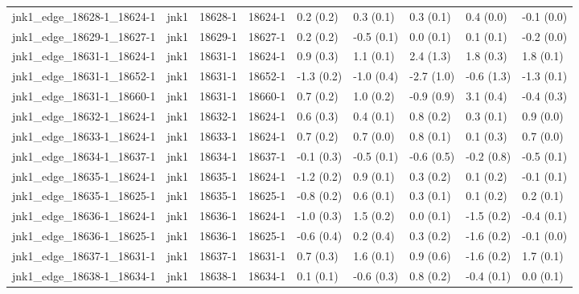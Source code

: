 \begin{tabular}{lllllllll}
jnk1\_edge\_18628-1\_18624-1        &      jnk1 &     18628-1 &     18624-1 &   0.2 (0.2) &         0.3 (0.1) &   0.3 (0.1) &   0.4 (0.0) &  -0.1 (0.0) \\
jnk1\_edge\_18629-1\_18627-1        &      jnk1 &     18629-1 &     18627-1 &   0.2 (0.2) &        -0.5 (0.1) &   0.0 (0.1) &   0.1 (0.1) &  -0.2 (0.0) \\
jnk1\_edge\_18631-1\_18624-1        &      jnk1 &     18631-1 &     18624-1 &   0.9 (0.3) &         1.1 (0.1) &   2.4 (1.3) &   1.8 (0.3) &   1.8 (0.1) \\
jnk1\_edge\_18631-1\_18652-1        &      jnk1 &     18631-1 &     18652-1 &  -1.3 (0.2) &        -1.0 (0.4) &  -2.7 (1.0) &  -0.6 (1.3) &  -1.3 (0.1) \\
jnk1\_edge\_18631-1\_18660-1        &      jnk1 &     18631-1 &     18660-1 &   0.7 (0.2) &         1.0 (0.2) &  -0.9 (0.9) &   3.1 (0.4) &  -0.4 (0.3) \\
jnk1\_edge\_18632-1\_18624-1        &      jnk1 &     18632-1 &     18624-1 &   0.6 (0.3) &         0.4 (0.1) &   0.8 (0.2) &   0.3 (0.1) &   0.9 (0.0) \\
jnk1\_edge\_18633-1\_18624-1        &      jnk1 &     18633-1 &     18624-1 &   0.7 (0.2) &         0.7 (0.0) &   0.8 (0.1) &   0.1 (0.3) &   0.7 (0.0) \\
jnk1\_edge\_18634-1\_18637-1        &      jnk1 &     18634-1 &     18637-1 &  -0.1 (0.3) &        -0.5 (0.1) &  -0.6 (0.5) &  -0.2 (0.8) &  -0.5 (0.1) \\
jnk1\_edge\_18635-1\_18624-1        &      jnk1 &     18635-1 &     18624-1 &  -1.2 (0.2) &         0.9 (0.1) &   0.3 (0.2) &   0.1 (0.2) &  -0.1 (0.1) \\
jnk1\_edge\_18635-1\_18625-1        &      jnk1 &     18635-1 &     18625-1 &  -0.8 (0.2) &         0.6 (0.1) &   0.3 (0.1) &   0.1 (0.2) &   0.2 (0.1) \\
jnk1\_edge\_18636-1\_18624-1        &      jnk1 &     18636-1 &     18624-1 &  -1.0 (0.3) &         1.5 (0.2) &   0.0 (0.1) &  -1.5 (0.2) &  -0.4 (0.1) \\
jnk1\_edge\_18636-1\_18625-1        &      jnk1 &     18636-1 &     18625-1 &  -0.6 (0.4) &         0.2 (0.4) &   0.3 (0.2) &  -1.6 (0.2) &  -0.1 (0.0) \\
jnk1\_edge\_18637-1\_18631-1        &      jnk1 &     18637-1 &     18631-1 &   0.7 (0.3) &         1.6 (0.1) &   0.9 (0.6) &  -1.6 (0.2) &   1.7 (0.1) \\
jnk1\_edge\_18638-1\_18634-1        &      jnk1 &     18638-1 &     18634-1 &   0.1 (0.1) &        -0.6 (0.3) &   0.8 (0.2) &  -0.4 (0.1) &   0.0 (0.1) \\

\end{tabular}
